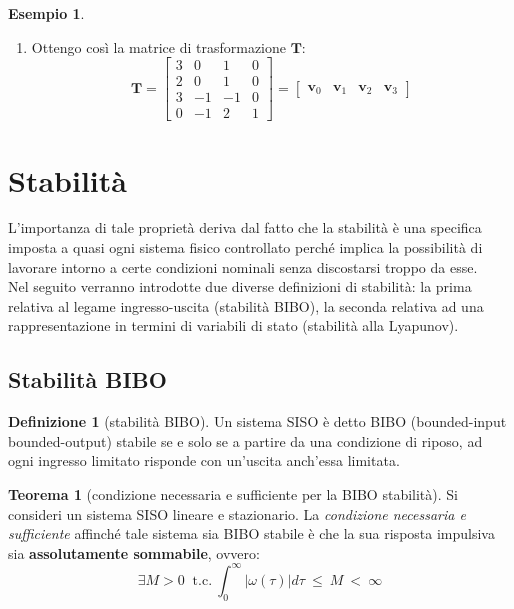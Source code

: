 \documentclass[a4paper]{article}
\renewcommand{\vec}{\bm}
\theoremstyle{definition}
\newtheorem{thm}{Teorema}[subsection]
\newtheorem{exmp}{Esempio}[section]
\newtheorem{defn}{Definizione}[subsection]
\begin{document}
\begin{exmp}
\begin{enumerate}
					\item Ottengo così la matrice di trasformazione $ \vec{T} $:
					\[
					    \vec{T}=
						\begin{bmatrix}
							3 & 0 & 1 & 0 \\
							2 & 0 & 1 & 0 \\
							3 & -1 & -1 & 0 \\
							0 & -1 & 2 & 1
						\end{bmatrix}
						=
						\begin{bmatrix}
							\vec{v}_0 & \vec{v}_1 & \vec{v}_2 & \vec{v}_3 
						\end{bmatrix}
					\]
				\end{enumerate}
				
				
			\end{exmp}
			
		\newpage
		
		\section{Stabilità}
			L’importanza di tale proprietà deriva dal fatto che la stabilità
			è una specifica imposta a quasi ogni sistema fisico controllato perché implica la possibilità di lavorare intorno a certe condizioni nominali senza discostarsi troppo da esse.\\
			Nel seguito verranno introdotte due diverse definizioni di stabilità: la prima relativa al legame ingresso-uscita (stabilità BIBO), la seconda relativa ad una rappresentazione in termini di variabili di stato (stabilità alla Lyapunov).
			
			\subsection{Stabilità BIBO}
				\begin{defn}[stabilità BIBO]
					Un sistema SISO è detto BIBO (bounded-input bounded-output)
					stabile se e solo se a partire da una condizione di riposo, ad ogni ingresso limitato
					risponde con un’uscita anch’essa limitata.
				\end{defn}
				
				\begin{thm}[condizione necessaria e sufficiente per la BIBO stabilità]
					Si consideri un sistema SISO lineare e stazionario. La \textit{condizione necessaria e sufficiente} affinché tale sistema sia BIBO stabile è che la sua risposta impulsiva sia \textbf{assolutamente sommabile}, ovvero:
					\[
						\exists M>0\ \text{ t.c.}\ \int^{\infty}_0 \lvert \omega (\tau) \rvert d\tau\ \leq\ M\ <\ \infty
					\]
				\end{thm}
				
\end{document}

